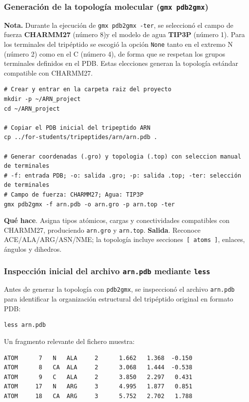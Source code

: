 \documentclass[12pt,a4paper]{article}
\begin{document}
\subsubsection*{Generación de la topología molecular (\texttt{gmx pdb2gmx})}
\noindent\textbf{Nota.} Durante la ejecución de \texttt{gmx pdb2gmx -ter}, se seleccionó el campo de fuerza \textbf{CHARMM27} (número 8)y el modelo de agua \textbf{TIP3P} (número 1). Para los terminales del tripéptido se escogió la opción \texttt{None} tanto en el extremo N (número 2) como en el C (número 4), de forma que se respetan los grupos terminales definidos en el PDB. Estas elecciones generan la topología estándar compatible con CHARMM27.
\begin{lstlisting}[style=bashstyle,texcl=false]
# Crear y entrar en la carpeta raiz del proyecto
mkdir -p ~/ARN_project
cd ~/ARN_project

# Copiar el PDB inicial del tripeptido ARN
cp ../for-students/tripeptides/arn/arn.pdb .

# Generar coordenadas (.gro) y topologia (.top) con seleccion manual de terminales
# -f: entrada PDB; -o: salida .gro; -p: salida .top; -ter: selección de terminales
# Campo de fuerza: CHARMM27; Agua: TIP3P
gmx pdb2gmx -f arn.pdb -o arn.gro -p arn.top -ter
\end{lstlisting}

\textbf{Qué hace}. Asigna tipos atómicos, cargas y conectividades compatibles
con CHARMM27, produciendo \texttt{arn.gro} y \texttt{arn.top}. \textbf{Salida}.
Reconoce ACE/ALA/ARG/ASN/NME; la topología incluye secciones~\verb+[ atoms ]+,
enlaces, ángulos y dihedros.

\subsubsection*{Inspección inicial del archivo \texttt{arn.pdb} mediante \texttt{less}}

Antes de generar la topología con \texttt{pdb2gmx}, se inspeccionó el archivo
\texttt{arn.pdb} para identificar la organización estructural del tripéptido
original en formato PDB:

\begin{verbatim}
less arn.pdb
\end{verbatim}

Un fragmento relevante del fichero muestra:

\begin{verbatim}
ATOM      7   N   ALA     2      1.662   1.368  -0.150
ATOM      8   CA  ALA     2      3.068   1.444  -0.538
ATOM      9   C   ALA     2      3.850   2.297   0.431
ATOM     17   N   ARG     3      4.995   1.877   0.851
ATOM     18   CA  ARG     3      5.752   2.702   1.788
\end{verbatim}
\end{document}
